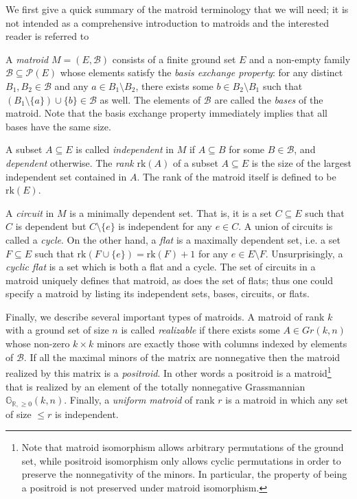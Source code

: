 \documentclass[11pt]{article}
\newcommand{\R}{\mathbb{R}}
\newcommand{\Gr}{\mathbb{G}_{\R, \geq 0}}
\newcommand{\rk}{\textrm{rk} }
\newcommand{\cP}{\mathcal{P}}
\newcommand{\cB}{\mathcal{B}}
\theoremstyle{remark}
\theoremstyle{definition}
\begin{document}
We first give a quick summary of the matroid terminology that we will need; it is not intended as a comprehensive introduction to matroids and the interested reader is referred to \cite{OxleyMatroidBook} 

A {\em matroid} $M = (E,\cB)$ consists of a finite ground set $E$ and a non-empty family $\cB \subseteq \cP(E)$ whose elements satisfy the {\em basis exchange property}: for any distinct $B_1,B_2 \in \cB$ and any $a \in B_1 \setminus B_2$, there exists some $b \in B_2 \setminus B_1$ such that $(B_1 \setminus \{a\})\cup \{b\} \in \cB$ as well. The elements of $\cB$ are called the {\em bases} of the matroid. Note that the basis exchange property immediately implies that all bases have the same size.

A subset $A \subseteq E$ is called {\em independent} in $M$ if $A \subseteq B$ for some $B \in \cB$, and {\em dependent} otherwise. The {\em rank}  $\rk(A)$ of a subset $A \subseteq E$ is the size of the largest independent set contained in $A$. The rank of the matroid itself is defined to be $\rk(E)$.

A {\em circuit} in $M$ is a minimally dependent set. That is, it is a set $C \subseteq E$ such that $C$ is dependent but $C \setminus \{e\}$ is independent for any $e \in C$. A union of circuits is called a {\em cycle}. On the other hand, a {\em flat} is a maximally dependent set, i.e. a set $F \subseteq E$ such that $\rk(F \cup \{e\}) = \rk(F) + 1$ for any $e \in E \setminus F$. Unsurprisingly, a {\em cyclic flat} is a set which is both a flat and a cycle. The set of circuits in a matroid uniquely defines that matroid, as does the set of flats; thus one could specify a matroid by listing its independent sets, bases, circuits, or flats.

Finally, we describe several important types of matroids. A matroid of rank $k$ with a ground set of size $n$ is called {\em realizable} if there exists some $A \in Gr(k,n)$ whose non-zero $k\times k$ minors are exactly those with columns indexed by elements of $\cB$. If all the maximal minors of the matrix are nonnegative then the matroid realized by this matrix is a {\em positroid}.  In other words a positroid is a matroid\footnote{Note that matroid isomorphism allows arbitrary permutations of the ground set, while positroid isomorphism only allows cyclic permutations in order to preserve the nonnegativity of the minors.  In particular, the property of being a positroid is not preserved under matroid isomorphism.} that is realized by an element of the totally nonnegative Grassmannian $\Gr(k,n)$. Finally, a {\em uniform matroid} of rank $r$ is a matroid in which any set of size $\leq r$ is independent.
\end{document}
